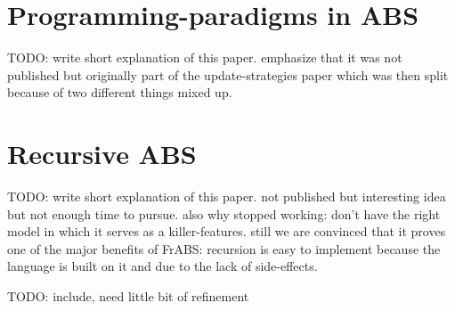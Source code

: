 \begin{appendices}


\chapter{Programming-paradigms in ABS}
TODO: write short explanation of this paper. emphasize that it was not published but originally part of the update-strategies paper which was then split because of two different things mixed up.



\chapter{Recursive ABS}
TODO: write short explanation of this paper. not published but interesting idea but not enough time to pursue. also why stopped working: don't have the right model in which it serves as a killer-features. still we are convinced that it proves one of the major benefits of FrABS: recursion is easy to implement because the language is built on it and due to the lack of side-effects.

TODO: include, need little bit of refinement

\end{appendices}